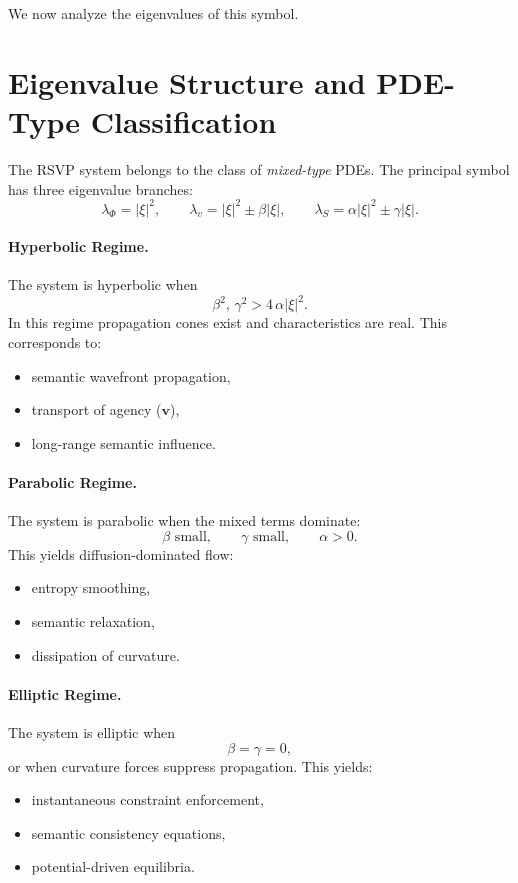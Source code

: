 We now analyze the eigenvalues of this symbol.

\section{Eigenvalue Structure and PDE-Type Classification}

The RSVP system belongs to the class of \emph{mixed-type} PDEs.
The principal symbol has three eigenvalue branches:
\[
\lambda_\Phi = |\xi|^2,
\qquad
\lambda_{v} = |\xi|^2 \pm \beta |\xi|,
\qquad
\lambda_S = \alpha |\xi|^2 \pm \gamma |\xi|.
\]

\paragraph{Hyperbolic Regime.}
The system is hyperbolic when
\[
\beta^2,\,\gamma^2 > 4\,\alpha|\xi|^2.
\]
In this regime propagation cones exist and characteristics are real.
This corresponds to:
\begin{itemize}
\item semantic wavefront propagation,
\item transport of agency ($\mathbf{v}$),
\item long-range semantic influence.
\end{itemize}

\paragraph{Parabolic Regime.}
The system is parabolic when the mixed terms dominate:
\[
\beta \text{ small},\qquad \gamma \text{ small}, \qquad \alpha > 0.
\]
This yields diffusion-dominated flow:
\begin{itemize}
\item entropy smoothing,
\item semantic relaxation,
\item dissipation of curvature.
\end{itemize}

\paragraph{Elliptic Regime.}
The system is elliptic when
\[
\beta = \gamma = 0,
\]
or when curvature forces suppress propagation.
This yields:
\begin{itemize}
\item instantaneous constraint enforcement,
\item semantic consistency equations,
\item potential-driven equilibria.
\end{itemize}

